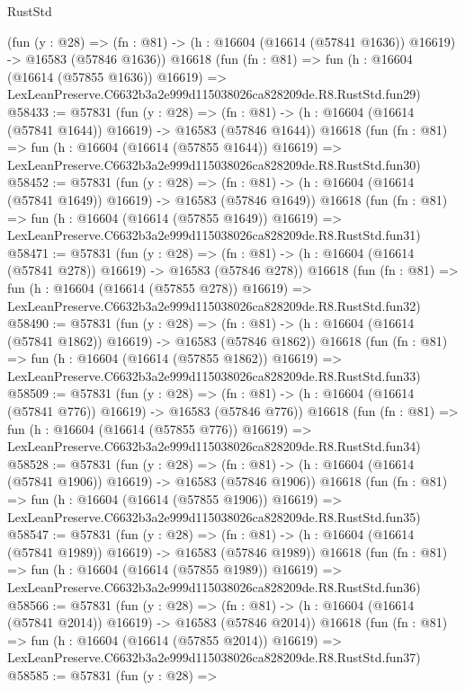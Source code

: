 \begin{lexlean}{RustStd}
\begin{coremodule}
    (fun (y : @28) =>
    (fn : @81) -> (h : @16604 (@16614 (@57841 @1636)) @16619) -> @16583 (@57846 @1636))
    @16618
    (fun (fn : @81) =>
    fun (h : @16604 (@16614 (@57855 @1636)) @16619) =>
    LexLeanPreserve.C6632b3a2e999d115038026ca828209de.R8.RustStd.fun29)
@58433 := @57831
    (fun (y : @28) =>
    (fn : @81) -> (h : @16604 (@16614 (@57841 @1644)) @16619) -> @16583 (@57846 @1644))
    @16618
    (fun (fn : @81) =>
    fun (h : @16604 (@16614 (@57855 @1644)) @16619) =>
    LexLeanPreserve.C6632b3a2e999d115038026ca828209de.R8.RustStd.fun30)
@58452 := @57831
    (fun (y : @28) =>
    (fn : @81) -> (h : @16604 (@16614 (@57841 @1649)) @16619) -> @16583 (@57846 @1649))
    @16618
    (fun (fn : @81) =>
    fun (h : @16604 (@16614 (@57855 @1649)) @16619) =>
    LexLeanPreserve.C6632b3a2e999d115038026ca828209de.R8.RustStd.fun31)
@58471 := @57831
    (fun (y : @28) =>
    (fn : @81) -> (h : @16604 (@16614 (@57841 @278)) @16619) -> @16583 (@57846 @278))
    @16618
    (fun (fn : @81) =>
    fun (h : @16604 (@16614 (@57855 @278)) @16619) =>
    LexLeanPreserve.C6632b3a2e999d115038026ca828209de.R8.RustStd.fun32)
@58490 := @57831
    (fun (y : @28) =>
    (fn : @81) -> (h : @16604 (@16614 (@57841 @1862)) @16619) -> @16583 (@57846 @1862))
    @16618
    (fun (fn : @81) =>
    fun (h : @16604 (@16614 (@57855 @1862)) @16619) =>
    LexLeanPreserve.C6632b3a2e999d115038026ca828209de.R8.RustStd.fun33)
@58509 := @57831
    (fun (y : @28) =>
    (fn : @81) -> (h : @16604 (@16614 (@57841 @776)) @16619) -> @16583 (@57846 @776))
    @16618
    (fun (fn : @81) =>
    fun (h : @16604 (@16614 (@57855 @776)) @16619) =>
    LexLeanPreserve.C6632b3a2e999d115038026ca828209de.R8.RustStd.fun34)
@58528 := @57831
    (fun (y : @28) =>
    (fn : @81) -> (h : @16604 (@16614 (@57841 @1906)) @16619) -> @16583 (@57846 @1906))
    @16618
    (fun (fn : @81) =>
    fun (h : @16604 (@16614 (@57855 @1906)) @16619) =>
    LexLeanPreserve.C6632b3a2e999d115038026ca828209de.R8.RustStd.fun35)
@58547 := @57831
    (fun (y : @28) =>
    (fn : @81) -> (h : @16604 (@16614 (@57841 @1989)) @16619) -> @16583 (@57846 @1989))
    @16618
    (fun (fn : @81) =>
    fun (h : @16604 (@16614 (@57855 @1989)) @16619) =>
    LexLeanPreserve.C6632b3a2e999d115038026ca828209de.R8.RustStd.fun36)
@58566 := @57831
    (fun (y : @28) =>
    (fn : @81) -> (h : @16604 (@16614 (@57841 @2014)) @16619) -> @16583 (@57846 @2014))
    @16618
    (fun (fn : @81) =>
    fun (h : @16604 (@16614 (@57855 @2014)) @16619) =>
    LexLeanPreserve.C6632b3a2e999d115038026ca828209de.R8.RustStd.fun37)
@58585 := @57831
    (fun (y : @28) =>

\end{coremodule}
\end{lexlean}
